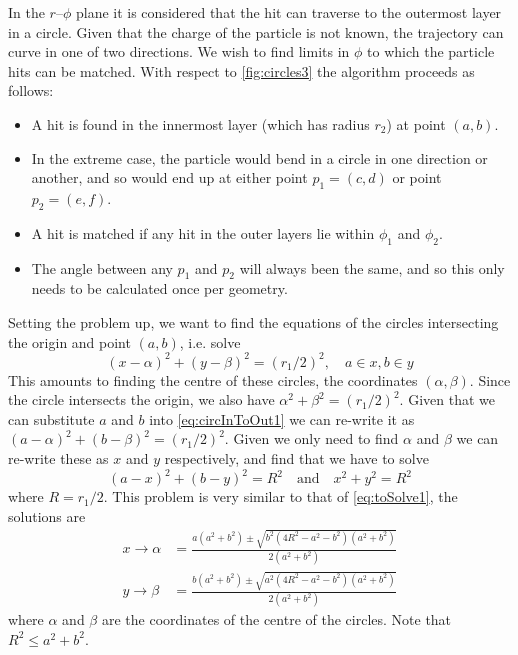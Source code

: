 \documentclass[a4paper, 12pt]{article}
\begin{document}
In the $r$--$\phi$ plane it is considered that the hit can traverse to the outermost layer in a circle.
Given that the charge of the particle is not known, the trajectory can curve in one of two directions.
We wish to find limits in $\phi$ to which the particle hits can be matched. 
With respect to \cref{fig:circles3} the algorithm proceeds as follows:
\begin{itemize}
  \item A hit is found in the innermost layer (which has radius $r_2$) at point $(a, b)$. 
  \item In the extreme case, the particle would bend in a circle in one direction or another, and so would end up at either point $p_1 = (c, d)$ or point $p_2 = (e, f)$. 
  \item A hit is matched if any hit in the outer layers lie within $\phi_1$ and $\phi_2$. 
  \item The angle between any $p_1$ and $p_2$ will always been the same, and so this only needs to be calculated once per geometry.  
\end{itemize}
Setting the problem up, we want to find the equations of the circles intersecting the origin and point $(a, b)$, i.e. solve
\begin{equation}
  (x - \alpha)^2 + (y - \beta)^2 = (r_1/2)^2, \quad a \in {x}, b \in {y} 
  \label{eq:circInToOut1}
\end{equation}
This amounts to finding the centre of these circles, the coordinates $(\alpha, \beta)$.
Since the circle intersects the origin, we also have  $\alpha ^2 + \beta^2 = (r_1 / 2 )^2$. 
Given that we can substitute $a$ and $b$ into \cref{eq:circInToOut1} we can re-write it as
$(a - \alpha)^2 + (b - \beta)^2 = (r_1/2)^2 $. Given we only need to find $\alpha$ and $\beta$ we can re-write these as $x$ and $y$ respectively, and find that we have to solve
\begin{equation}
  (a - x)^2 + (b - y)^2 = R^2 \quad \mathrm{and} \quad x^2 + y^2 = R^2
\end{equation}
where $R=r_1 / 2$. This problem is very similar to that of \cref{eq:toSolve1}, the solutions are
\begin{align}
  x \rightarrow \alpha & = \frac{a(a^2 + b^2) \pm \sqrt{b^2 (4R^2 -a^2 -b^2)   (a^2 + b^2) }}{2 (a^2 + b^2)} \\
  y \rightarrow \beta & = \frac{b(a^2 + b^2) \pm \sqrt{a^2 (4R^2 -a^2 - b^2) (a^2 + b^2) }}{2 (a^2 + b^2)}
\end{align}
where $\alpha$ and $\beta$ are the coordinates of the centre of the circles. Note that $R^2 \leq a^2 + b^2$.
\end{document}
